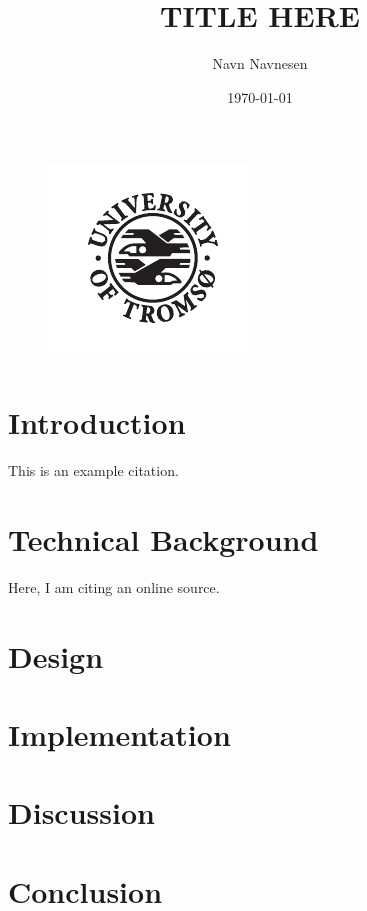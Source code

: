 \documentclass[12pt]{article}
\title{TITLE HERE}
\author{Navn Navnesen}
\date{\today}
\begin{document}
\begin{titlingpage}
	\maketitle
	\begin{figure}[hb]
		\centering
		\includegraphics[scale=3.4]{uit.pdf}
	\end{figure}
\end{titlingpage}
\begin{multicols}{2}

\section*{Introduction}
This is an example citation\cite{kake}.

\blindtext

\section*{Technical Background}
Here, I am citing an online source\cite{torsk}.

\blindtext

\section*{Design}
\Blindtext[2]

\section*{Implementation}
\blindtext

\section*{Discussion}
\Blindtext[2]

\section*{Conclusion}
\blindtext

\end{multicols}
\begin{multicols}{2}
\printbibliography
\end{multicols}
\end{document}
